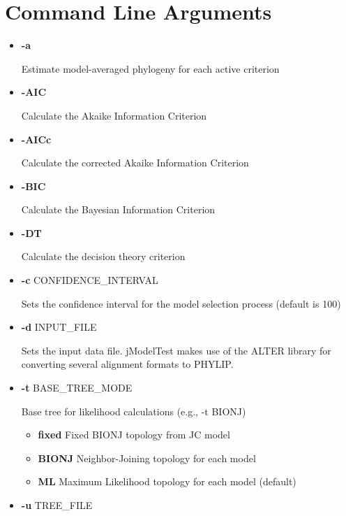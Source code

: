 \documentclass[11pt,twoside,a4paper]{article}
\begin{document}

\section{Command Line Arguments}

\begin{itemize}

\item  {\bf -a}

Estimate model-averaged phylogeny for each active criterion

\item  {\bf -AIC}

Calculate the Akaike Information Criterion

\item  {\bf -AICc}

Calculate the corrected Akaike Information Criterion

\item  {\bf -BIC}

Calculate the Bayesian Information Criterion

\item  {\bf -DT}

Calculate the decision theory criterion

\item  {\bf -c} CONFIDENCE\_INTERVAL

Sets the confidence interval for the model selection process (default is 100)

\item  {\bf -d} INPUT\_FILE

Sets the input data file. jModelTest makes use of the ALTER library for converting several alignment formats to PHYLIP.

\item  {\bf -t} BASE\_TREE\_MODE

Base tree for likelihood calculations (e.g., -t BIONJ)
\begin{itemize}
     \item {\bf fixed}  Fixed BIONJ topology from JC model
     \item {\bf BIONJ}  Neighbor-Joining topology for each model
     \item {\bf ML}     Maximum Likelihood topology for each model (default)
\end{itemize}

\item  {\bf -u} TREE\_FILE


\end{itemize}
\end{document}
